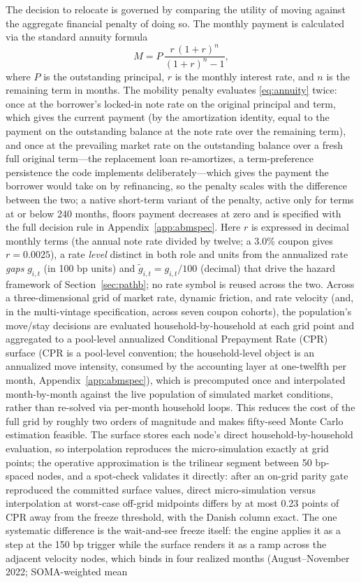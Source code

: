 \documentclass[12pt]{article}
\begin{document}
The decision to relocate is governed by comparing the utility of moving against the aggregate financial penalty of doing so. The monthly payment is calculated via the standard annuity formula
\begin{equation}\label{eq:annuity}
M = P\,\frac{r\,(1+r)^{n}}{(1+r)^{n}-1},
\end{equation}
where $P$ is the outstanding principal, $r$ is the monthly interest rate, and $n$ is the remaining term in months. The mobility penalty evaluates \eqref{eq:annuity} twice: once at the borrower's locked-in note rate on the original principal and term, which gives the current payment (by the amortization identity, equal to the payment on the outstanding balance at the note rate over the remaining term), and once at the prevailing market rate on the outstanding balance over a fresh full original term---the replacement loan re-amortizes, a term-preference persistence the code implements deliberately---which gives the payment the borrower would take on by refinancing, so the penalty scales with the difference between the two; a native short-term variant of the penalty, active only for terms at or below 240 months, floors payment decreases at zero and is specified with the full decision rule in Appendix~\ref{app:abmspec}. Here $r$ is expressed in decimal monthly terms (the annual note rate divided by twelve; a 3.0\% coupon gives $r = 0.0025$), a rate \emph{level} distinct in both role and units from the annualized rate \emph{gaps} $g_{i,t}$ (in 100 bp units) and $\tilde g_{i,t} = g_{i,t}/100$ (decimal) that drive the hazard framework of Section~\ref{sec:pathb}; no rate symbol is reused across the two. Across a three-dimensional grid of market rate, dynamic friction, and rate velocity (and, in the multi-vintage specification, across seven coupon cohorts), the population's move/stay decisions are evaluated household-by-household at each grid point and aggregated to a pool-level annualized Conditional Prepayment Rate (CPR) surface (CPR is a pool-level convention; the household-level object is an annualized move intensity, consumed by the accounting layer at one-twelfth per month, Appendix~\ref{app:abmspec}), which is precomputed once and interpolated month-by-month against the live population of simulated market conditions, rather than re-solved via per-month household loops. This reduces the cost of the full grid by roughly two orders of magnitude and makes fifty-seed Monte Carlo estimation feasible. The surface stores each node's direct household-by-household evaluation, so interpolation reproduces the micro-simulation exactly at grid points; the operative approximation is the trilinear segment between 50 bp-spaced nodes, and a spot-check validates it directly: after an on-grid parity gate reproduced the committed surface values, direct micro-simulation versus interpolation at worst-case off-grid midpoints differs by at most 0.23 points of CPR away from the freeze threshold, with the Danish column exact. The one systematic difference is the wait-and-see freeze itself: the engine applies it as a step at the 150 bp trigger while the surface renders it as a ramp across the adjacent velocity nodes, which binds in four realized months (August--November 2022; SOMA-weighted mean 
\end{document}

